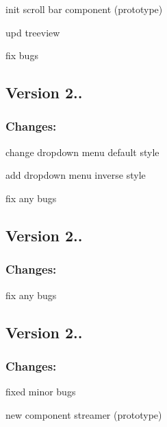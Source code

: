 \begin{DoxyItemize}
\item init scroll bar component (prototype)
\item upd treeview
\item fix bugs
\end{DoxyItemize}

\subsection*{Version 2..}

\subsubsection*{Changes\-:}


\begin{DoxyItemize}
\item change dropdown menu default style
\item add dropdown menu inverse style
\item fix any bugs
\end{DoxyItemize}

\subsection*{Version 2..}

\subsubsection*{Changes\-:}


\begin{DoxyItemize}
\item fix any bugs
\end{DoxyItemize}

\subsection*{Version 2..}

\subsubsection*{Changes\-:}


\begin{DoxyItemize}
\item fixed minor bugs
\item new component streamer (prototype)
\end{DoxyItemize}

